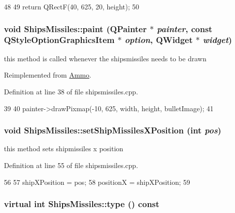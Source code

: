 \begin{DoxyCode}
48 {
49     return QRectF(40, 625, 20, height);
50 }
\end{DoxyCode}
\hypertarget{class_ships_missiles_a709bf076bb74b37149907c06ffae942e}{
\subsubsection[{paint}]{\setlength{\rightskip}{0pt plus 5cm}void ShipsMissiles::paint (QPainter $\ast$ {\em painter}, \/  const QStyleOptionGraphicsItem $\ast$ {\em option}, \/  QWidget $\ast$ {\em widget})}}
\label{class_ships_missiles_a709bf076bb74b37149907c06ffae942e}
this method is called whenever the shipsmissiles needs to be drawn 

Reimplemented from \hyperlink{class_ammo_a3f4c8157fab369e46bac4bb88348d8c1}{Ammo}.

Definition at line 38 of file shipsmissiles.cpp.


\begin{DoxyCode}
39 {
40    painter->drawPixmap(-10, 625, width, height, bulletImage);
41 }
\end{DoxyCode}
\hypertarget{class_ships_missiles_a9a88fe4620fbe0e6cedc6f16188936d1}{
\subsubsection[{setShipMissilesXPosition}]{\setlength{\rightskip}{0pt plus 5cm}void ShipsMissiles::setShipMissilesXPosition (int {\em pos})}}
\label{class_ships_missiles_a9a88fe4620fbe0e6cedc6f16188936d1}
this method sets shipmissiles x position 

Definition at line 55 of file shipsmissiles.cpp.


\begin{DoxyCode}
56 {
57     shipXPosition = pos;
58     positionX = shipXPosition;
59 }
\end{DoxyCode}
\hypertarget{class_ships_missiles_afe6d8431cee08b306942285f35842eea}{
\subsubsection[{type}]{\setlength{\rightskip}{0pt plus 5cm}virtual int ShipsMissiles::type () const}}
\label{class_ships_missiles_afe6d8431cee08b306942285f35842eea}


